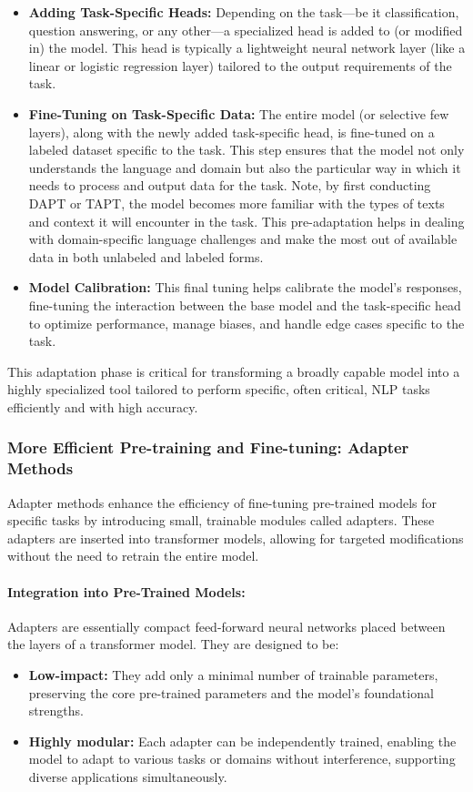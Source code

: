 \documentclass[12pt]{article}
\begin{document}
\begin{itemize}
    \item \textbf{Adding Task-Specific Heads:} Depending on the task—be it classification, question answering, or any other—a specialized head is added to (or modified in) the model. This head is typically a lightweight neural network layer (like a linear or logistic regression layer) tailored to the output requirements of the task.
    \item \textbf{Fine-Tuning on Task-Specific Data:} The entire model (or selective few layers), along with the newly added task-specific head, is fine-tuned on a labeled dataset specific to the task. This step ensures that the model not only understands the language and domain but also the particular way in which it needs to process and output data for the task. Note, by first conducting DAPT or TAPT, the model becomes more familiar with the types of texts and context it will encounter in the task. This pre-adaptation helps in dealing with domain-specific language challenges and make the most out of available data in both unlabeled and labeled forms.
    \item \textbf{Model Calibration:} This final tuning helps calibrate the model’s responses, fine-tuning the interaction between the base model and the task-specific head to optimize performance, manage biases, and handle edge cases specific to the task.
\end{itemize}
This adaptation phase is critical for transforming a broadly capable model into a highly specialized tool tailored to perform specific, often critical, NLP tasks efficiently and with high accuracy.


\subsubsection{More Efficient Pre-training and Fine-tuning: Adapter Methods}
Adapter methods enhance the efficiency of fine-tuning pre-trained models for specific tasks by introducing small, trainable modules called adapters. These adapters are inserted into transformer models, allowing for targeted modifications without the need to retrain the entire model.

\paragraph{Integration into Pre-Trained Models:}
Adapters are essentially compact feed-forward neural networks placed between the layers of a transformer model. They are designed to be:
\begin{itemize}
    \item \textbf{Low-impact:} They add only a minimal number of trainable parameters, preserving the core pre-trained parameters and the model's foundational strengths.
    \item \textbf{Highly modular:} Each adapter can be independently trained, enabling the model to adapt to various tasks or domains without interference, supporting diverse applications simultaneously.
\end{itemize}
\end{document}
